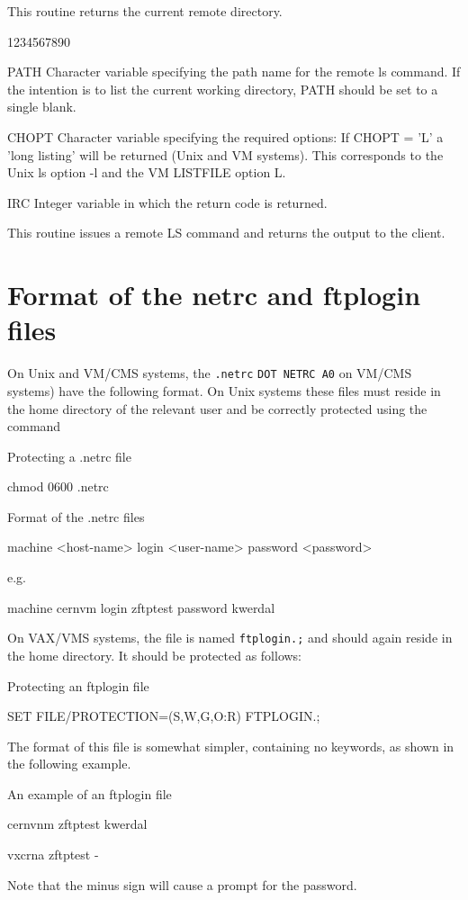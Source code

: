 \par
This routine returns the current remote directory.
\begin{DLtt}{1234567890}
\item[PATH]Character variable specifying the path name for the remote
ls command. If the intention is to list the current working
directory, PATH should be set to a single blank.
\item[CHOPT]Character variable specifying the required options:
If CHOPT = 'L' a 'long listing' will be returned (Unix and VM systems).
This corresponds to the Unix ls option -l and the VM LISTFILE option L.
\item[IRC]Integer variable in which the return code is returned.
\end{DLtt}
\par
This routine issues a remote LS command and returns the output
to the client.

\chapter{Format of the netrc and ftplogin files}
\label{NETRC}
\par
On Unix and VM/CMS systems, the {\tt .netrc} {\tt DOT NETRC A0} on
VM/CMS systems)  have the following format. On Unix systems these
files must reside in the home directory of the relevant user and
be correctly protected using the command
\begin{XMPt}{Protecting a .netrc file}

chmod 0600 .netrc

\end{XMPt}
\begin{XMPt}{Format of the .netrc files}

machine <host-name> login <user-name> password <password>

e.g.

machine cernvm login zftptest password kwerdal

\end{XMPt}
\par
On VAX/VMS systems, the file is named {\tt ftplogin.;} and should again
reside in the home directory. It should be protected as follows:
\begin{XMPt}{Protecting an ftplogin file}

SET FILE/PROTECTION=(S,W,G,O:R) FTPLOGIN.;

\end{XMPt}
\par
The format of this file is somewhat simpler, containing no keywords,
as shown in the following example.
\begin{XMPt}{An example of an ftplogin file}

cernvnm zftptest kwerdal

vxcrna  zftptest -

\end{XMPt}
\par
Note that the minus sign will cause a prompt for the password.
